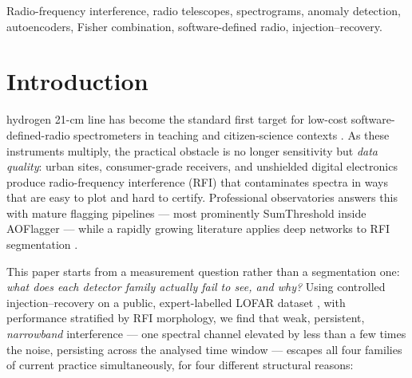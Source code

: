 \documentclass[journal]{IEEEtran}
\begin{document}
\begin{abstract}
decisive CI separation; on the persistent-narrowband stratum the
median-based stage itself attains
$0.998$ [0.994, 1.000] (paired permutation $p<1/2000$ against the classical
baseline), and the full fusion confirms $0.997$ on the held-out stratum.  On a real ~EUR~200 instrument (RSP1, single dish, urban site)
the pipeline blindly discovers a $66.28$\,kHz comb artefact ($10^{4}$-permutation
and 64-channel-block-permutation $p<1\mathrm{e}{-4}$) and recovers injected one-pixel lines from $+10\%$ contrast while
all four baseline families remain at chance.  The detector runs at
4.1\,ms/patch on CPU --- $7.5\times$ faster than the classical pipeline.
\end{abstract}

\begin{IEEEkeywords}
Radio-frequency interference, radio telescopes, spectrograms, anomaly
detection, autoencoders, Fisher combination, software-defined radio,
injection--recovery.
\end{IEEEkeywords}

\section{Introduction}
 hydrogen 21-cm line has become the standard first target
for low-cost software-defined-radio spectrometers in teaching and
citizen-science contexts
\cite{saraos2026,pnu2025,phelps2024}.  As these instruments multiply, the
practical obstacle is no longer sensitivity but \emph{data quality}:
urban sites, consumer-grade receivers, and unshielded digital electronics
produce radio-frequency interference (RFI) that contaminates spectra in
ways that are easy to plot and hard to certify.  Professional observatories
answers this with mature flagging pipelines --- most prominently
SumThreshold inside AOFlagger \cite{offringa2010,offringa2012} --- while a
rapidly growing literature applies deep networks to RFI segmentation
\cite{akeret2017,vafaieisadr2020,mesarcik2022,mesarcik2023,dutoit2024,pritchard2024,rfihwt2025}.

This paper starts from a measurement question rather than a segmentation
one: \emph{what does each detector family actually fail to see, and why?}
Using controlled injection--recovery on a public, expert-labelled LOFAR
dataset \cite{mesarcik2022}, with performance stratified by RFI morphology,
we find that weak, persistent, \emph{narrowband} interference --- one
spectral channel elevated by less than a few times the noise, persisting
across the analysed time window --- escapes all four families of current
practice simultaneously, for four different structural reasons:
\end{document}
